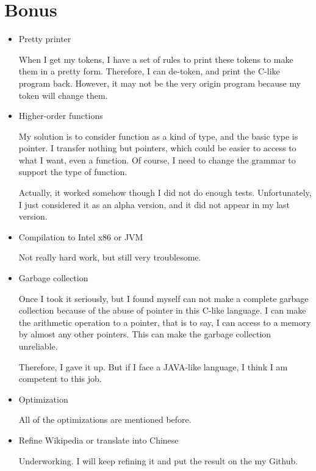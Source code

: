 \documentclass[preprint, 9pt]{sigplanconf}
\begin{document}
\section{Bonus}
    \begin{itemize}
        \item{Pretty printer}

            When I get my tokens, I have a set of rules to print these tokens to make them in a pretty form.
            Therefore, I can de-token, and print the C-like program back. However, it may not be the very origin program because my token will change them.
        \item{Higher-order functions}

            My solution is to consider function as a kind of type, and the basic type is pointer.
            I transfer nothing but pointers, which could be easier to access to what I want, even a function.
            Of course, I need to change the grammar to support the type of function.

            Actually, it worked somehow though I did not do enough tests.
            Unfortunately, I just considered it as an alpha version, and it did not appear in my last version.

        \item{Compilation to Intel x86 or JVM}

            Not really hard work, but still very troublesome.

        \item{Garbage collection}

            Once I took it seriously, but I found myself can not make a complete garbage collection because of the abuse of pointer in this C-like language.
            I can make the arithmetic operation to a pointer, that is to say, I can access to a memory by almost any other pointers.
            This can make the garbage collection unreliable.

            Therefore, I gave it up.
            But if I face a JAVA-like language, I think I am competent to this job.

        \item{Optimization}
        
            All of the optimizations are mentioned before.

        \item{Refine Wikipedia or translate into Chinese}

            Underworking.
            I will keep refining it and put the result on the my Github.
        

\end{itemize}
\end{document}
